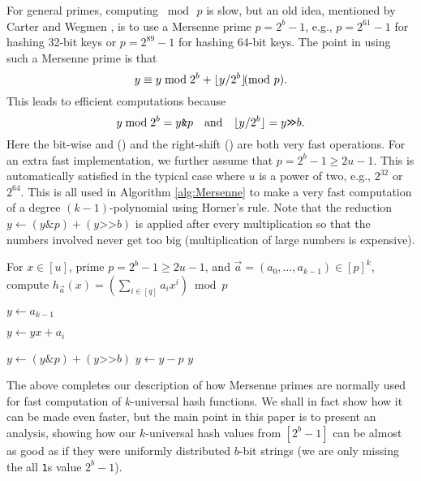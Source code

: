 For general primes, computing $\bmod\,p$ is slow, but an old idea,
mentioned by Carter and Wegmen \cite{carter77universal}, is to use a
Mersenne prime $p=2^b-1$, e.g., $p=2^{61}-1$ for hashing 32-bit keys or
$p=2^{89}-1$ for hashing 64-bit keys. The point in using such a Mersenne prime
is that
\begin{equation}\label{eq:Mersenne}
y\equiv y\bmod 2^{b}+\floor{y/2^b}\ppmod {p}.
\end{equation}
This leads to efficient computations because 
\[y\bmod 2^{b}=y\texttt{\&}p\quad\textnormal{and}\quad\lfloor {y/2^b} \rfloor=y\texttt{>\!>}b.\]
Here the bit-wise {\sc and} (\andtt) and the right-shift (\rshiftt) are
both very fast operations. For
an extra fast implementation, we further assume that $p=2^b-1\geq 2u-1$.
This is automatically satisfied in the typical case where $u$ is a power
of two, e.g., $2^{32}$ or $2^{64}$. This is all used in Algorithm \ref{alg:Mersenne} to make a very fast
computation of a degree $(k-1)$-polynomial using Horner's rule. Note that
the reduction $y\gets (y\texttt\&p)+(y\texttt{>>}b)$ is applied after
every multiplication so that the numbers involved never get too big (multiplication of large numbers is expensive).
\begin{algorithm}\label{alg:Mersenne}
   \caption{
      For $x\in [u]$, prime $p=2^b-1\geq 2u-1$,
      and $\vec a=(a_0,\ldots,a_{k-1})\in[p]^k$,
      compute $h_{\vec a}(x)=\left(\sum_{i\in[q]}a_i x^i\right)\bmod p$
   }
   \begin{algorithmic}[1]
       \State $y\gets a_{k-1}$

           \State $y\gets yx+a_i$

           \State $y\gets (y\texttt\&p)+(y\texttt{>>}b)$
       \EndFor
          \State $y\gets y-p$
       \EndIf
       \State \Return $y$
   \end{algorithmic}
\end{algorithm}
The above completes our description of how Mersenne primes are
normally used for fast computation of $k$-universal hash functions.
We shall in fact show how it can be made even faster, but the main
point in this paper is to present an analysis, showing how our
$k$-universal hash values from $[2^b-1]$ can be almost as good as if
they were uniformly distributed $b$-bit strings (we are only missing
the all \texttt{1}s value $2^b-1$). 

